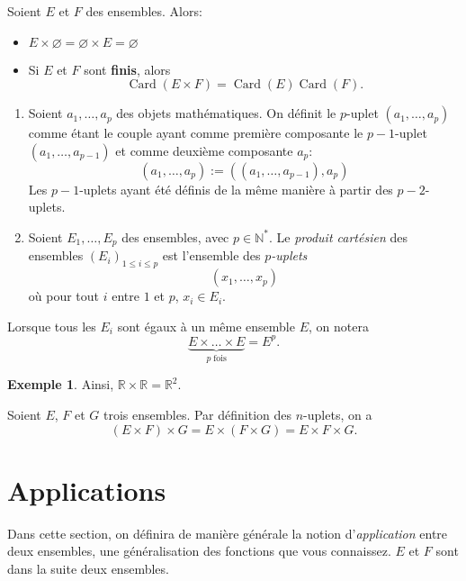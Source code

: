 \documentclass[twoside,11pt]{article}
\newcommand{\N}{\mathbb N}
\newcommand{\R}{\mathbb R}
\DeclareMathOperator{\Card}{\mathrm{Card}}
\theoremstyle{definition}
\newtheorem{exe}{Exemple}
\theoremstyle{remark}
\theoremstyle{theorem}
\begin{document}
\begin{prop}
	Soient $E$ et $F$ des ensembles. Alors:
	\begin{itemize}
		\item $E\times\varnothing=\varnothing\times E=\varnothing$
		\item Si $E$ et $F$ sont \textbf{finis}, alors
		\[
		\Card(E\times F) = \Card(E)\Card(F). 
		\]
	\end{itemize}
\end{prop}

\begin{defn}[Généralisation]\leavevmode
	\begin{enumerate}
		\item Soient $a_1,\ldots,a_p$ des objets mathématiques. On définit le $p$-uplet $(a_1,\ldots,a_p)$ comme étant le couple ayant comme première composante le $p-1$-uplet $(a_1,\ldots,a_{p-1})$ et comme deuxième composante $a_p$:
		\[
		(a_1,\ldots,a_p) := \left((a_1,\ldots,a_{p-1}),a_p\right)
		\]
		 Les $p-1$-uplets ayant été définis de la même manière à partir des $p-2$-uplets.
		\item Soient $E_1,\ldots,E_p$ des ensembles, avec $p\in\N^*$. Le \textit{produit cartésien} des ensembles $(E_i)_{1\leq i\leq p}$ est l'ensemble des \textit{$p$-uplets}
		\[ (x_1,\ldots,x_p)
		\]
		où pour tout $i$ entre $1$ et $p$, $x_i\in E_i$.
	\end{enumerate}
\end{defn}

Lorsque tous les $E_i$ sont égaux à un même ensemble $E$, on notera
\[
\underbrace{E\times\ldots \times E}_{p\; \text{fois}} = E^p.
\]

\begin{exe}
	Ainsi, $\R\times\R = \R^2$.
\end{exe}

\begin{prop}
	Soient $E$, $F$ et $G$ trois ensembles. Par définition des $n$-uplets, on a 
	\[(E\times F)\times G = E\times(F\times G) = E\times F\times G. \]
\end{prop}


\section{Applications}

Dans cette section, on définira de manière générale la notion d'\textit{application} entre deux ensembles, une généralisation des fonctions que vous connaissez. $E$ et $F$ sont dans la suite deux ensembles.
\end{document}
